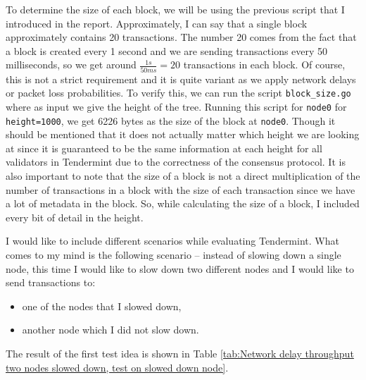 \documentclass{article}
\begin{document}
To determine the size of each block, we will be using the previous script that I introduced in the report. Approximately, I can say that a single block approximately contains 20 transactions. The number 20 comes from the fact that a block is created every 1 second and we are sending transactions every 50 milliseconds, so we get around $\frac{1s}{50 ms} = 20$ transactions in each block. Of course, this is not a strict requirement and it is quite variant as we apply network delays or packet loss probabilities. To verify this, we can run the script \texttt{block\_size.go} where as input we give the height of the tree. Running this script for \texttt{node0} for \texttt{height=1000}, we get 6226 bytes as the size of the block at \texttt{node0}. Though it should be mentioned that it does not actually matter which height we are looking at since it is guaranteed to be the same information at each height for all validators in Tendermint due to the correctness of the consensus protocol. It is also important to note that the size of a block is not a direct multiplication of the number of transactions in a block with the size of each transaction since we have a lot of metadata in the block. So, while calculating the size of a block, I included every bit of detail in the height.

I would like to include different scenarios while evaluating Tendermint. What comes to my mind is the following scenario -- instead of slowing down a single node, this time I would like to slow down two different nodes and I would like to send transactions to:

\begin{itemize}
    \item one of the nodes that I slowed down,
    \item another node which I did not slow down.
\end{itemize}

The result of the first test idea is shown in Table \ref{tab:Network delay throughput two nodes slowed down, test on slowed down node}.
\end{document}
